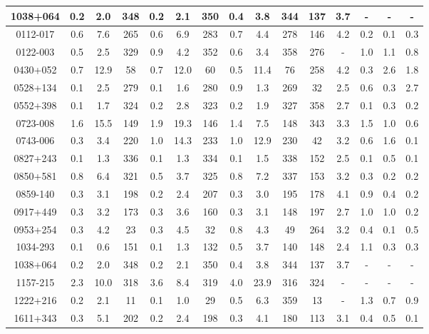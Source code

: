 \documentclass{aa-note}   %
\begin{document}
\begin{table}
\begin{tabular}{ccccccccccccccc}
        1038+064 & 0.2 & 2.0 & 348 & 0.2 & 2.1 & 350 & 0.4 & 3.8 & 344 & 137 & 3.7 & - & - & - \\
        \hline \noalign{\smallskip}
        0112-017 & 0.6 & 7.6 & 265 & 0.6 & 6.9 & 283 & 0.7 & 4.4 & 278 & 146 & 4.2 & 0.2 & 0.1 & 0.3 \\
        0122-003 & 0.5 & 2.5 & 329 & 0.9 & 4.2 & 352 & 0.6 & 3.4 & 358 & 276 & - & 1.0 & 1.1 & 0.8 \\
        0430+052 & 0.7 & 12.9 & 58 & 0.7 & 12.0 & 60 & 0.5 & 11.4 & 76 & 258 & 4.2 & 0.3 & 2.6 & 1.8 \\
        0528+134 & 0.1 & 2.5 & 279 & 0.1 & 1.6 & 280 & 0.9 & 1.3 & 269 & 32 & 2.5 & 0.6 & 0.3 & 2.7 \\
        0552+398 & 0.1 & 1.7 & 324 & 0.2 & 2.8 & 323 & 0.2 & 1.9 & 327 & 358 & 2.7 & 0.1 & 0.3 & 0.2 \\
        0723-008 & 1.6 & 15.5 & 149 & 1.9 & 19.3 & 146 & 1.4 & 7.5 & 148 & 343 & 3.3 & 1.5 & 1.0 & 0.6 \\
        0743-006 & 0.3 & 3.4 & 220 & 1.0 & 14.3 & 233 & 1.0 & 12.9 & 230 & 42 & 3.2 & 0.6 & 1.6 & 0.1 \\
        0827+243 & 0.1 & 1.3 & 336 & 0.1 & 1.3 & 334 & 0.1 & 1.5 & 338 & 152 & 2.5 & 0.1 & 0.5 & 0.1 \\
        0850+581 & 0.8 & 6.4 & 321 & 0.5 & 3.7 & 325 & 0.8 & 7.2 & 337 & 153 & 3.2 & 0.3 & 0.2 & 0.2 \\
        0859-140 & 0.3 & 3.1 & 198 & 0.2 & 2.4 & 207 & 0.3 & 3.0 & 195 & 178 & 4.1 & 0.9 & 0.4 & 0.2 \\
        0917+449 & 0.3 & 3.2 & 173 & 0.3 & 3.6 & 160 & 0.3 & 3.1 & 148 & 197 & 2.7 & 1.0 & 1.0 & 0.2 \\
        0953+254 & 0.3 & 4.2 & 23 & 0.3 & 4.5 & 32 & 0.8 & 4.3 & 49 & 264 & 3.2 & 0.4 & 0.1 & 0.5 \\
        1034-293 & 0.1 & 0.6 & 151 & 0.1 & 1.3 & 132 & 0.5 & 3.7 & 140 & 148 & 2.4 & 1.1 & 0.3 & 0.3 \\
        1038+064 & 0.2 & 2.0 & 348 & 0.2 & 2.1 & 350 & 0.4 & 3.8 & 344 & 137 & 3.7 & - & - & - \\
        1157-215 & 2.3 & 10.0 & 318 & 3.6 & 8.4 & 319 & 4.0 & 23.9 & 316 & 324 & - & - & - & - \\
        1222+216 & 0.2 & 2.1 & 11 & 0.1 & 1.0 & 29 & 0.5 & 6.3 & 359 & 13 & - & 1.3 & 0.7 & 0.9 \\
        1611+343 & 0.3 & 5.1 & 202 & 0.2 & 2.4 & 198 & 0.3 & 4.1 & 180 & 113 & 3.1 & 0.4 & 0.5 & 0.1 \\

\end{tabular}
\end{table}
\end{document}

